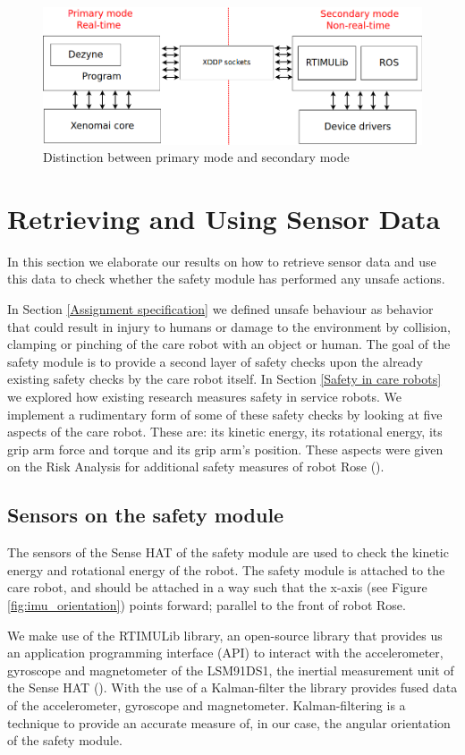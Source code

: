 \documentclass[12pt]{scrreprt}
\begin{document}
\begin{figure}[H]
    \centering
    \includegraphics[width=\textwidth]{Figures/results/communication_scheme.png}
    \caption{Distinction between primary mode and secondary mode}
    \label{fig:communication_scheme}
\end{figure}

\newpage
\section{Retrieving and Using Sensor Data}
\label{Retrieving and Using Sensor Data}
In this section we elaborate our results on how to retrieve sensor data and use this data to check whether the safety module has performed any unsafe actions.
\par
In Section \ref{Assignment specification} we defined unsafe behaviour as behavior that could result in injury to humans or damage to the environment by collision, clamping or pinching of the care robot with an object or human. The goal of the safety module is to provide a second layer of safety checks upon the already existing safety checks by the care robot itself. In Section \ref{Safety in care robots} we explored how existing research measures safety in service robots. We implement a rudimentary form of some of these safety checks by looking at five aspects of the care robot. These are: its kinetic energy, its rotational energy, its grip arm force and torque and its grip arm's position. These aspects were given on the Risk Analysis for additional safety measures of robot Rose (\cite{risk_analysis_additional}).

\subsection{Sensors on the safety module}
The sensors of the Sense HAT of the safety module are used to check the kinetic energy and rotational energy of the robot. The safety module is attached to the care robot, and should be attached in a way such that the x-axis (see Figure \ref{fig:imu_orientation}) points forward; parallel to the front of robot Rose.
\par
We make use of the RTIMULib library, an open-source library that provides us an application programming interface (API) to interact with the accelerometer, gyroscope and magnetometer of the LSM91DS1, the inertial measurement unit of the Sense HAT (\cite{rtimulib}). With the use of a Kalman-filter the library provides fused data of the accelerometer, gyroscope and magnetometer. Kalman-filtering is a technique to provide an accurate measure of, in our case, the angular orientation of the safety module.
\end{document}
